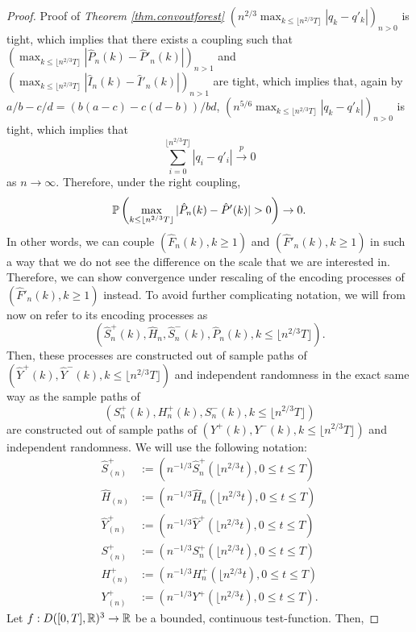 \begin{proof}{Proof of \emph{Theorem \ref{thm.convoutforest}}}
$\left(n^{2/3}\max_{k\leq \lfloor n^{2/3}T\rfloor }|q_k-q'_k|\right)_{n>0}$ is tight, which implies that there exists a coupling such that $\left(\max_{k\leq \lfloor n^{2/3}T\rfloor } |\hat{P}_n(k)-\hat{P}'_n(k)|\right)_{n>1}$ and $\left(\max_{k\leq \lfloor n^{2/3}T\rfloor } |\hat{I}_n(k)-\hat{I}'_n(k)|\right)_{n>1}$ are tight, which implies that, again by $a/b-c/d=(b(a-c)-c(d-b))/bd$, 
$\left(n^{5/6}\max_{k\leq \lfloor n^{2/3}T\rfloor }|q_k-q'_k|\right)_{n>0}$ is tight, which implies that 
$$\sum_{i=0}^{\lfloor n^{2/3}T\rfloor }|q_i-q'_i|\overset{p}{\to}0$$
as $n\to \infty$. 
Therefore, under the right coupling, 
$$\P\left(\max_{k\leq \lfloor n^{2/3} T \rfloor}|\hat{P}_n(k)-\hat{P}'(k)|>0\right)\to 0.$$
In other words, we can couple $(\hat{F}_n(k),k\geq 1)$ and $(\hat{F}'_n(k),k\geq 1)$ in such a way that we do not see the difference on the scale that we are interested in. Therefore, we can show convergence under rescaling of the encoding processes of $(\hat{F}'_n(k),k\geq 1)$ instead. To avoid further complicating notation, we will from now on refer to its encoding processes as $$(\hat{S}^{+}_n(k),\hat{H}_n, \hat{S}^-_n(k), \hat{P}_n(k),k\leq \lfloor n^{2/3}T\rfloor).$$ Then, these processes are constructed out of sample paths of $(\hat{Y}^+(k),\hat{Y}^-(k), k\leq \lfloor n^{2/3}T\rfloor )$ and independent randomness in the exact same way as the sample paths of $$({S}_n^{+}(k),{H}_n^+(k),{S}_n^-(k), k \leq \lfloor n^{2/3}T\rfloor )$$ are constructed out of sample paths of $(Y^+(k),Y^-(k), k\leq \lfloor n^{2/3}T\rfloor )$ and independent randomness. 
We will use the following notation:\begin{align*}
    \hat{S}^{+}_{(n)}&:=\left(n^{-1/3}\hat{S}^{+}_n\left(\lfloor n^{2/3} t \right),0\leq t \leq T\right)\\
    \hat{H}_{(n)}&:=\left(n^{-1/3}\hat{H}_n\left(\lfloor n^{2/3} t \right),0\leq t \leq T\right)\\
    \hat{Y}^+_{(n)}&:=\left(n^{-1/3}\hat{Y}^+\left(\lfloor n^{2/3} t \right),0\leq t \leq T\right)\\
     {S}^{+}_{(n)}&:=\left(n^{-1/3}{S}^{+}_n\left(\lfloor n^{2/3} t \right),0\leq t \leq T\right)\\
    {H}^+_{(n)}&:=\left(n^{-1/3}{H}^+_n\left(\lfloor n^{2/3} t \right),0\leq t \leq T\right)\\
    {Y}^+_{(n)}&:=\left(n^{-1/3}{Y}^+\left(\lfloor n^{2/3} t \right),0\leq t \leq T\right).
\end{align*}
Let $f:D([0,T],{\mathbb R})^3\to {\mathbb R}$ be a bounded, continuous test-function. Then,

\end{proof}
